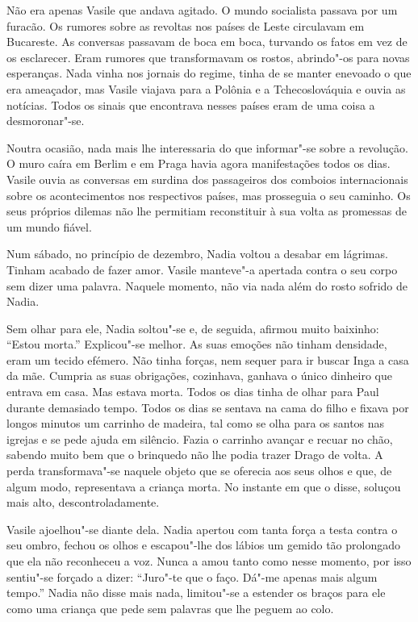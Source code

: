 \bigskip

Não era apenas Vasile que andava agitado. O mundo socialista passava por
um furacão. Os rumores sobre as revoltas nos países de Leste circulavam
em Bucareste. As conversas passavam de boca em boca, turvando os fatos
em vez de os esclarecer. Eram rumores que transformavam os rostos,
abrindo"-os para novas esperanças. Nada vinha nos jornais do regime,
tinha de se manter enevoado o que era ameaçador, mas Vasile viajava para
a Polônia e a Tchecoslováquia e ouvia as notícias. Todos os sinais que
encontrava nesses países eram de uma coisa a desmoronar"-se.

Noutra ocasião, nada mais lhe interessaria do que informar"-se sobre a
revolução. O muro caíra em Berlim e em Praga havia agora manifestações
todos os dias. Vasile ouvia as conversas em surdina dos passageiros dos
comboios internacionais sobre os acontecimentos nos respectivos
países, mas prosseguia o seu caminho. Os seus próprios dilemas não lhe
permitiam reconstituir à sua volta as promessas de um mundo fiável.

\bigskip

Num sábado, no princípio de dezembro, Nadia voltou a desabar em
lágrimas. Tinham acabado de fazer amor. Vasile manteve"-a apertada contra
o seu corpo sem dizer uma palavra. Naquele momento, não via nada além do
rosto sofrido de Nadia.

Sem olhar para ele, Nadia soltou"-se e, de seguida, afirmou muito
baixinho: ``Estou morta.'' Explicou"-se melhor.
As suas emoções não tinham densidade, eram um tecido efémero. Não tinha
forças, nem sequer para ir buscar Inga a casa da mãe. Cumpria as suas
obrigações, cozinhava, ganhava o único dinheiro que entrava em casa. Mas
estava morta. Todos os dias tinha de olhar para Paul durante demasiado
tempo. Todos os dias se sentava na cama do filho e fixava por longos
minutos um carrinho de madeira, tal como se olha para os santos nas
igrejas e se pede ajuda em silêncio. Fazia o carrinho avançar e recuar
no chão, sabendo muito bem que o brinquedo não lhe podia trazer Drago de
volta. A perda transformava"-se naquele objeto que se oferecia aos seus
olhos e que, de algum modo, representava a criança morta. No instante em
que o disse, soluçou mais alto, descontroladamente.

Vasile ajoelhou"-se diante dela. Nadia apertou com tanta
força a testa contra o seu ombro, fechou os olhos e escapou"-lhe dos
lábios um gemido tão prolongado que ela não reconheceu a voz. Nunca a
amou tanto como nesse momento, por isso sentiu"-se forçado a dizer:
``Juro"-te que o faço. Dá"-me apenas mais algum tempo.'' Nadia não disse
mais nada, limitou"-se a estender os braços para ele como uma criança que
pede sem palavras que lhe peguem ao colo.


